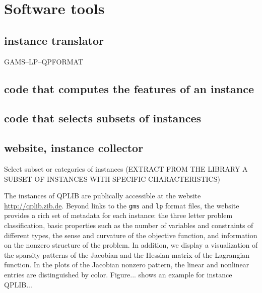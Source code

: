 
\section{Software tools}\label{subsec:tools}

\subsection{instance translator}
GAMS--LP--QPFORMAT


\subsection{code that computes the features of an instance}

\subsection{code that selects subsets of instances}

\subsection{website, instance collector}
Select subset or categories of instances (EXTRACT FROM THE LIBRARY A SUBSET OF INSTANCES WITH SPECIFIC CHARACTERISTICS)

The instances of QPLIB are publically accessible at the website \url{http://qplib.zib.de}.
%
Beyond links to the \texttt{gms} and \texttt{lp} format files, the website provides a rich set of metadata for each
instance: the three letter problem classification, basic properties such as the number of variables and constraints of
different types, the sense and curvature of the objective function, and information on the nonzero structure of the
problem.
%
In addition, we display a visualization of the sparsity patterns of the Jacobian and the Hessian matrix of the
Lagrangian function.  In the plots of the Jacobian nonzero pattern, the linear and nonlinear entries are distinguished
by color.  Figure... shows an example for instance QPLIB...


